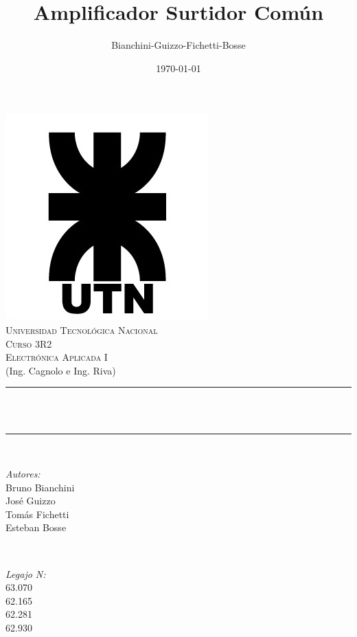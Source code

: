 \documentclass[12pt]{article}
\title{Amplificador Surtidor Común}								%
\author{Bianchini-Guizzo-Fichetti-Bosse}								%
\date{\today}											%
\makeatletter
\let\thetitle\@title
\let\thedate\@date
\makeatother
\begin{document}

\begin{titlepage}
	\centering
    \vspace*{0.5 cm}
    \includegraphics[scale = 0.45]{utn_logo.jpg}\\[1.0 cm]	%
    \textsc{\LARGE Universidad Tecnológica Nacional}\\[2.0 cm]	%
	\textsc{\Large Curso 3R2}\\[0.5 cm]				%
	\textsc{\large Electrónica Aplicada I}\\[0 cm]				%
	\textrm{\large (Ing. Cagnolo e Ing. Riva)}\\[0.5 cm]
    \rule{\linewidth}{0.2 mm} \\[0.4 cm]
	{ \huge \bfseries \thetitle}\\
	\rule{\linewidth}{0.2 mm} \\[1 cm]
	
	\begin{minipage}{0.4\textwidth}
		\begin{flushleft} \large
			\emph{Autores:}\\
			Bruno Bianchini\\José Guizzo\\Tomás Fichetti\\Esteban Bosse
			\end{flushleft}
			\end{minipage}~
			\begin{minipage}{0.4\textwidth}
			\begin{flushright} \large
			\emph{Legajo N:} \\
			 63.070\\62.165\\62.281\\62.930									%
		\end{flushright}
	\end{minipage}\\[2 cm]
	
	{\large \thedate}\\[2 cm]
 
	\vfill
	
\end{titlepage}
\end{document}
